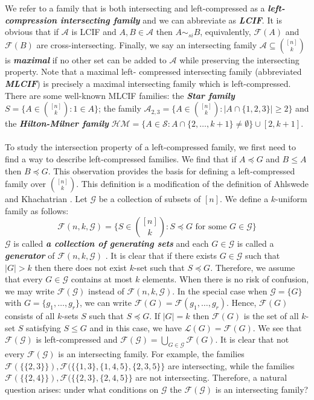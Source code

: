 \documentclass[reqno,english]{amsart}
\theoremstyle{plain}
\theoremstyle{remark}
\newcommand{\0}[0]{\emptyset}
\renewcommand{\1}[0]{\textbf{1}}
\theoremstyle{plain}
\theoremstyle{remark}
\renewcommand{\1}[0]{\textbf{1}}
\begin{document}
We refer to a family that is both intersecting and left-compressed as a {\bf \emph{ left-compression intersecting family}} and we can abbreviate as {\bf \emph{ LCIF}}. It is obvious that if $\mathcal{A}$ is LCIF and $A,B \in \mathcal{A}$ then $A \sim_{si}B$, equivalently, $\mathcal{F}({A})$ and $\mathcal{F}(B)$ are cross-intersecting. Finally, we say an intersecting family $\mathcal{A} \subseteq \binom{[n]}{k}$ is {\bf \emph{ maximal}} if no other set can be added to $\mathcal{A}$ while preserving the intersecting property. Note that a maximal left- compressed intersecting family (abbreviated {\bf \emph{ MLCIF}}) is precisely a maximal intersecting family which is left-compressed. There are some well-known MLCIF families: the {\bf \emph{Star family}} $S=\{ A\in \binom{[n]}{k}: 1\in A\}$; the family $\mathcal{A}_{2,3}=\{A \in \binom{[n]}{k}:|A\cap \{1,2,3\}|\geq 2\}$ and the {\bf \emph{ Hilton-Milner family}} $\mathcal{H}\mathcal{M}=\{A\in \mathcal{S}:A\cap \{2,\ldots,k+1\} \neq \emptyset \}\cup [2,k+1]$.
\\ \\
 To study the intersection property of a left-compressed family, we first need to find a way to describe left-compressed families. We find that if $A \preceq G$ and $B \leq A$ then $B \preceq G$. This observation provides the basis for defining a left-compressed family over $\binom{[n]}{k}$. This definition is a modification of the definition of Ahlswede and Khachatrian \cite{AK}. 
Let $\mathcal{G}$ be a collection of subsets of $[n]$. We define a $k$-uniform family as follows:
    $$\mathcal{F}(n,k,\mathcal{G})=\bigg \{S \in \binom{[n]}{k} : S \preceq G \text{ for some } G \in \mathcal{G}  \bigg \}$$
$\mathcal{G}$ is called {\bf \emph{ a collection of generating sets}} and each $G \in \mathcal{G}$ is called a {\bf \emph{generator}} of $\mathcal{F}(n,k,\mathcal{G})$ . It is clear that if there exists $G \in \mathcal{G}$ such that $|G| > k$ then there does not exist $k$-set such that $S \preceq G$. Therefore, we assume that every $G \in \mathcal{G}$ contains at most $k$ elements. When there is no risk of confusion, we may write $\mathcal{F}(\mathcal{G})$ instead of $\mathcal{F}(n,k,\mathcal{G})$. In the special case when $\mathcal{G}=\{G\}$ with $G=\{g_{1},\ldots,g_{r}\}$, we can write $\mathcal{F}(G)=\mathcal{F}(g_{1},\ldots,g_{r})$.
Hence, $\mathcal{F}(G)$ consists of all $k$-sets $S$ such that $S \preceq G$. If $|G|=k$ then $\mathcal{F}(G)$ is the set of all $k$-set $S$ satisfying $S \leq G$ and in this case, we have $\mathcal{L}(G)=\mathcal{F}(G)$. We see that $\mathcal{F}(\mathcal{G})$ is left-compressed and $\mathcal{F}(\mathcal{G})=\bigcup_{G \in \mathcal{G}}\mathcal{F}(G)$. It is clear that not every $\mathcal{F}(\mathcal{G})$ is an intersecting family. For example, the families $\mathcal{F}(\{\{2,3\}\}),\mathcal{F}(\{\{1,3\},\{1,4,5\},\{2,3,5\} \}$ are intersecting, while the families $\mathcal{F}(\{\{2,4\}\}), \mathcal{F}(\{\{2,3\},\{2,4,5\} \}$ are not intersecting. Therefore, a natural question arises: under what conditions on $\mathcal{G}$ the $\mathcal{F}(\mathcal{G})$ is an intersecting family?\\
\end{document}
